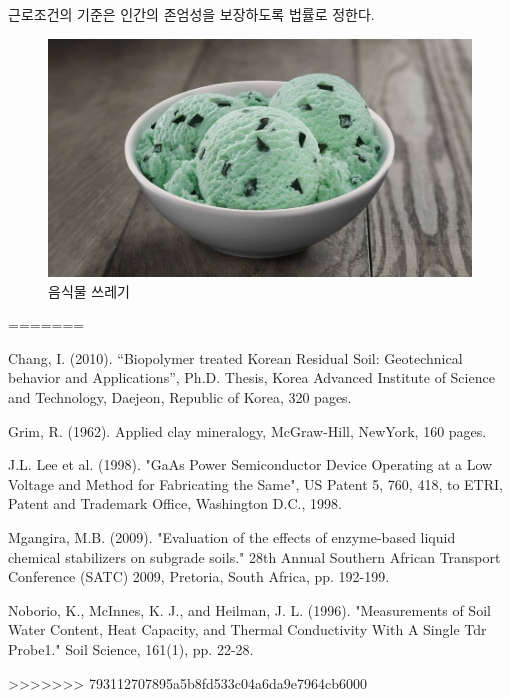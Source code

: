 \documentclass{thesis-SJ}
\begin{document}
	근로조건의 기준은 인간의 존엄성을 보장하도록 법률로 정한다.\cite{lamport1994latex}
	
	\begin{figure}[ht]
		\centering
		\includegraphics[width=.75\linewidth]{images/minttrash}
		\caption{음식물 쓰레기}
		\label{fig:minttrash}
	\end{figure}
\makebibliography
=======
	
\begin{thebibliography}{10}
	Chang, I. (2010). “Biopolymer treated Korean Residual Soil: Geotechnical behavior and Applications”,  Ph.D. Thesis, Korea Advanced Institute of Science and Technology, Daejeon, Republic of Korea, 320 pages.
	
	Grim, R. (1962). Applied clay mineralogy, McGraw-Hill, NewYork, 160 pages.
	
	J.L. Lee et al. (1998). "GaAs Power Semiconductor Device Operating at a Low Voltage and Method for Fabricating the Same", US Patent 5, 760, 418, to ETRI, Patent and Trademark Office, Washington D.C., 1998.
	
	Mgangira, M.B. (2009). "Evaluation of the effects of enzyme-based liquid chemical stabilizers on subgrade soils." 28th Annual Southern African Transport Conference (SATC) 2009, Pretoria, South Africa, pp. 192-199.
	
	Noborio, K., McInnes, K. J., and Heilman, J. L. (1996). "Measurements of Soil Water Content, Heat Capacity, and Thermal Conductivity With A Single Tdr Probe1."  Soil Science, 161(1), pp. 22-28.
	
\end{thebibliography}
	
>>>>>>> 793112707895a5b8fd533c04a6da9e7964cb6000
\end{document}
